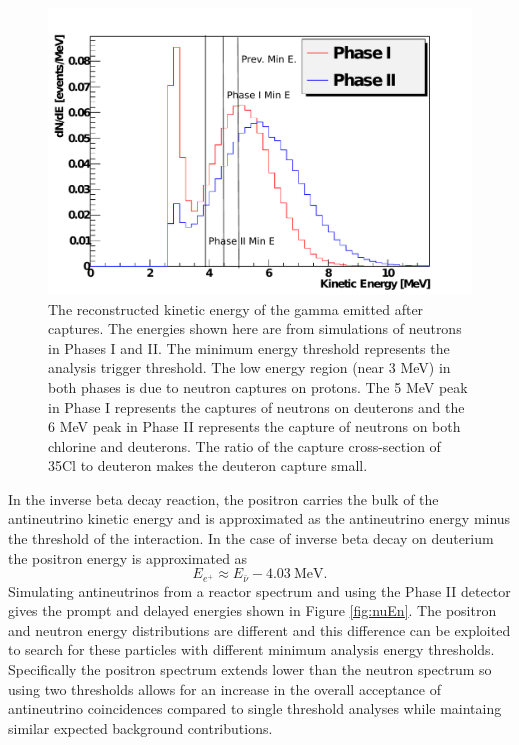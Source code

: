 \documentclass[preprint,12pt]{elsarticle}
\begin{document}
\begin{figure}[htbp]
   \centering
   \includegraphics[width=14 cm]{nDandS.pdf} %
   \caption{The reconstructed kinetic energy of the gamma emitted after captures. The energies shown here are from simulations of neutrons in Phases I and II. The minimum energy threshold represents the analysis trigger threshold. The low energy region (near 3 MeV) in both phases is due to neutron captures on protons. The 5 MeV peak in Phase I represents the captures of neutrons on deuterons and the 6 MeV peak in Phase II represents the capture of neutrons on both chlorine and deuterons. The ratio of the capture cross-section of 35Cl to deuteron makes the deuteron capture small.}
   \label{fig:neutronEn}
\end{figure}

In the inverse beta decay reaction, the positron carries the bulk of the antineutrino kinetic energy and is approximated as the antineutrino energy minus the threshold of the interaction. In the case of inverse beta decay on deuterium the positron energy is approximated as
\begin{equation}
E_{e^+}\approx E_{\bar{\nu}}-4.03\ \mathrm{MeV}.
\end{equation}
Simulating antineutrinos from a reactor spectrum and using the Phase II detector gives the prompt and delayed energies shown in Figure \ref{fig:nuEn}.  The positron and neutron energy distributions are different and this difference can be exploited to search for these particles with different minimum analysis energy thresholds.  Specifically the positron spectrum extends lower than the neutron spectrum so using two thresholds allows for an increase in the overall acceptance of antineutrino coincidences compared to single threshold analyses while maintaing similar expected background contributions.  
\end{document}
